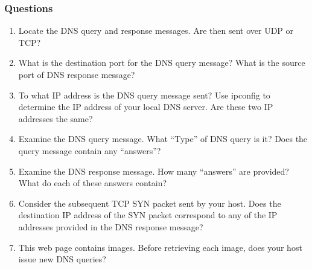     \subsubsection*{Questions}
        \begin{enumerate}[label=\bfseries Problem \arabic*:,leftmargin=*,labelindent=1em]
            \item Locate the DNS query and response messages. Are then sent over UDP or TCP?\\[0.2mm]
            \soln
            
            \item What is the destination port for the DNS query message? 
            What is the source port of DNS response message?\\[0.2mm]
            \soln
            
            \item To what IP address is the DNS query message sent? 
            Use ipconfig to determine the IP address of your local DNS server. 
            Are these two IP addresses the same?\\[0.2mm]
            \soln
            
            \item Examine the DNS query message. What “Type” of DNS query is it? 
            Does the query message contain any “answers”?\\[0.2mm]
            \soln
            
            \item Examine the DNS response message. How many “answers” are provided? 
            What do each of these answers contain?\\[0.2mm]
            \soln
            
            \item Consider the subsequent TCP SYN packet sent by your host.
            Does the destination IP address of the SYN packet correspond to any of the IP addresses 
            provided in the DNS response message?\\[0.2mm]
            \soln
            
            \item This web page contains images. Before retrieving each image, 
            does your host issue new DNS queries?\\[0.2mm]
            \soln
            
        \end{enumerate}
